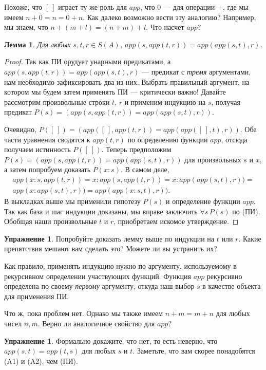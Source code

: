 \documentclass[12pt,notitlepage]{article}
\theoremstyle{plain}
\newtheorem{lemma}[thm]{Лемма}
\theoremstyle{definition}
\newtheorem{exc}[thm]{Упражнение}
\theoremstyle{plain}
\newcommand{\1}{\mathbf{1}}
\newcommand{\0}{\mathbf{0}}
\begin{document}
Похоже, что $[\ ]$ играет ту же роль для $app$, что $0$ --- для операции ${+}$, где мы имеем $n + 0 = n = 0 + n$. Как далеко возможно вести эту аналогию? Например, мы знаем, что $n + (m + l) = (n + m) + l$. Что насчет $app$?

\begin{lemma}\label{cs:app_assoc}
	Для любых $s, t, r \in S(A)$, $app (s, app(t, r)) = app (app (s, t), r)$.
\end{lemma}
\begin{proof}
	Так как ПИ орудует унарными предикатами, а $app (s, app(t, r)) = app (app (s, t), r)$ --- предикат с \emph{тремя} аргументами, нам необходимо зафиксировать два из них. Выбрать правильный аргумент, на котором мы будем затем применять ПИ --- критически важно! Давайте рассмотрим произвольные строки $t$, $r$ и применим индукцию на $s$, получая предикат $P(s) = (app (s, app(t, r)) = app (app (s, t), r))$. 
	
	Очевидно, $P([\ ]) = (app ([\ ], app(t, r)) = app (app ([\ ], t), r))$. Обе части уравнения сводятся к $app(t,r)$ по определению функции $app$, отсюда получаем истинность $P([\ ])$. Теперь предположим $P(s) = (app (s, app(t, r)) = app (app (s, t), r))$ для произвольных $s$ и $x$, а затем попробуем доказать $P(x:s)$. В самом деле,
	\begin{multline*}
		app (x:s, app(t, r)) = x : app (s, app(t, r)) = x : app (app (s, t), r)) =\\
		app (x : app (s, t), r)) = app (app (x : s, t), r)).
	\end{multline*}
	В выкладках выше мы применили гипотезу $P(s)$ и определение функции $app$. Так как база и шаг индукции доказаны, мы вправе заключить $\forall s\, P(s)$ по (ПИ). Обобщая наши произвольные $t$ и $r$, приобретаем искомое утверждение.
\end{proof}
\begin{exc}
	Попробуйте доказать лемму выше по индукции на $t$ или $r$. Какие препятствия мешают вам сделать это? Можете ли вы устранить их?
\end{exc}

Как правило, применять индукцию нужно по аргументу, используемому в рекурсивном определении участвующих функций. Функция $app$ рекурсивно определена по своему \emph{первому} аргументу, откуда наш выбор $s$ в качестве объекта для применения ПИ.

\medskip
Что ж, пока проблем нет. Однако мы также имеем $n + m = m + n$ для любых чисел $n, m$. Верно ли аналогичное свойство для $app$?
\begin{exc}
	Формально докажите, что нет, то есть неверно, что $app(s,t) = app(t,s)$ для любых $s$ и $t$. Заметьте, что вам скорее понадобятся (A1) и (A2), чем (ПИ).
\end{exc}
\end{document}
